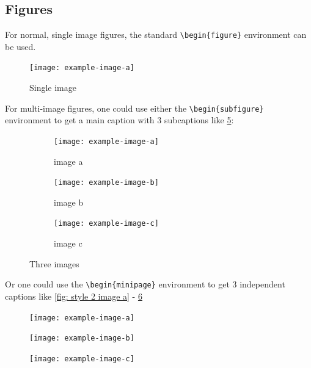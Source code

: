 \documentclass[a4paper, table]{article}
\begin{document}
\subsection{Figures}
For normal, single image figures, the standard \texttt{\textbackslash begin\{figure\}} environment can be used. 

\begin{figure}[h]
    \centering
    \texttt{[image: example-image-a]}
    \label{fig: style 0 image a}
    \caption{Single image}
\end{figure}


For multi-image figures, one could use either the \texttt{\textbackslash begin\{subfigure\}} environment to get a main caption with 3 subcaptions like \cref{fig: three images}:

\begin{figure}[h]
     \centering
     \begin{subfigure}[b]{0.3\textwidth}
         \centering
         \texttt{[image: example-image-a]}
         \caption{image a}
         \label{fig: style 1 image a}
     \end{subfigure}
     \hfill
     \begin{subfigure}[b]{0.3\textwidth}
         \centering
         \texttt{[image: example-image-b]}
         \caption{image b}
         \label{fig: style 1 image b}
     \end{subfigure}
     \hfill
     \begin{subfigure}[b]{0.3\textwidth}
         \centering
         \texttt{[image: example-image-c]}
         \caption{image c}
         \label{fig: style 1 image c}
     \end{subfigure}
        \caption{Three images}
        \label{fig: three images}
\end{figure}


 Or one could use the \texttt{\textbackslash begin\{minipage\}} environment to get 3 independent captions like \cref{fig: style 2 image a} - \ref{fig: style 2 image c}

\begin{figure}[h]
\centering
\begin{minipage}{0.3\textwidth}
  \centering
  \texttt{[image: example-image-a]}
  \label{fig: style 2 image a}
\end{minipage}
\hfill
\begin{minipage}{0.3\textwidth}
  \centering
  \texttt{[image: example-image-b]}
  \label{fig: style 2 image b}
\end{minipage}
\hfill
\begin{minipage}{0.3\textwidth}
  \centering
  \texttt{[image: example-image-c]}
  \label{fig: style 2 image c}
\end{minipage}
\end{figure}
\end{document}
